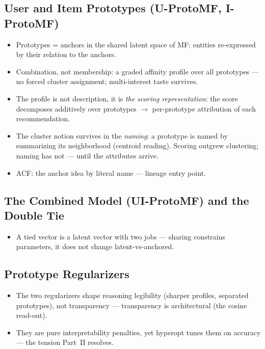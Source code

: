 \subsection{User and Item Prototypes (U-ProtoMF, I-ProtoMF)}
\label{sec:bg-protomf-ui}
\begin{itemize}
    \item Prototypes = anchors in the shared latent space of MF; entities re-expressed by their relation to the anchors.
    \item Combination, not membership: a graded affinity profile over all prototypes — no forced cluster assignment; multi-interest taste survives.
    \item The profile is not description, it is \emph{the scoring representation}: the score decomposes additively over prototypes $\to$ per-prototype attribution of each recommendation.
    \item The cluster notion survives in the \emph{naming}: a prototype is named by summarizing its neighborhood (centroid reading). Scoring outgrew clustering; naming has not — until the attributes arrive.
    \item ACF: the anchor idea by literal name — lineage entry point.
\end{itemize}

\subsection{The Combined Model (UI-ProtoMF) and the Double Tie}
\label{sec:bg-protomf-tie}
\begin{itemize}
    \item A tied vector is a latent vector with two jobs — sharing constrains parameters, it does not change latent-vs-anchored.
\end{itemize}

\subsection{Prototype Regularizers}
\label{sec:bg-protomf-reg}
\begin{itemize}
    \item The two regularizers shape reasoning legibility (sharper profiles, separated prototypes), not transparency — transparency is architectural (the cosine read-out).
    \item They are pure interpretability penalties, yet hyperopt tunes them on accuracy — the tension Part~II resolves.
\end{itemize}


